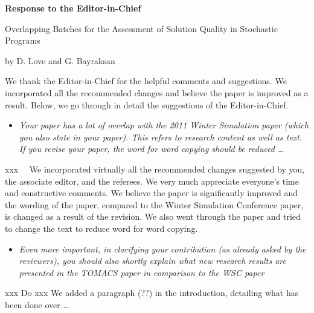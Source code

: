 \documentclass[11pt,notitlepage,onecolumn]{article}
\begin{document}

\singlespacing

\baselineskip0.26in


\pagebreak

\begin{center}
\textbf{\Large Response to the Editor-in-Chief} \medskip

{\large Overlapping Batches for the Assessment of Solution Quality in Stochastic Programs} \medskip

{\footnotesize by D. Love and G. Bayraksan}
\end{center}

\bigskip



We thank the Editor-in-Chief for the helpful comments and suggestions. 
We incorporated all the recommended changes and believe the paper is improved as a result. 
Below, we go through in detail the suggestions of the Editor-in-Chief.\medskip


\begin{itemize}
\item[] \textit{Your paper has a lot of overlap with the 2011 Winter Simulation paper  (which you also state in your paper). 
This refers to research content as well as text. 
If you revise your paper, the word for word copying should be reduced \ldots}
\end{itemize}

\noindent xxx \ \ 
 We incorporated virtually all the recommended changes suggested by you, the associate editor, and the referees. 
We very much appreciate everyone's time and constructive comments. 
We believe the paper is significantly improved and the wording of the paper, compared to the Winter Simulation Conference paper, is changed as a result of the revision.
We also went through the paper and tried to change the text to reduce word for word copying. 
  \medskip 

\begin{itemize}
\item[]\textit{Even more important, in clarifying your contribution (as already asked by the reviewers), you should also shortly explain what new research results are presented in the  TOMACS paper in comparison to the WSC paper}
\end{itemize}

\noindent
xxx Do xxx  We added a paragraph (??) in the introduction, detailing what has been done over \ldots
\end{document}
